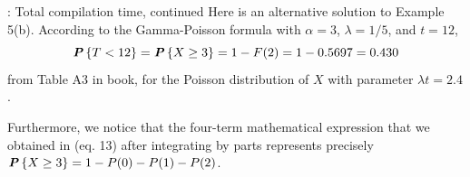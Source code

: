 \begin{example}{: Total compilation time, continued}
    Here is an alternative solution to Example 5(b). According to the Gamma-Poisson formula with $\alpha = 3$, $\lambda = 1/5$, and $t = 12$,
    \begin{equation*}
        \textbf{\textit{P}}\left\{T < 12\right\} = \textbf{\textit{P}}\left\{X \geq 3\right\} = 1 - F(2) = 1 - 0.5697 = 0.430
    \end{equation*}
    from Table A3 in book, for the Poisson distribution of $X$ with parameter $\lambda t = 2.4$.\newline

    Furthermore, we notice that the four-term mathematical expression that we obtained in (eq. 13) after integrating by parts represents precisely
    $\textbf{\textit{P}}\left\{X \geq 3\right\} = 1 - P(0) - P(1) - P(2)$.
\end{example}

